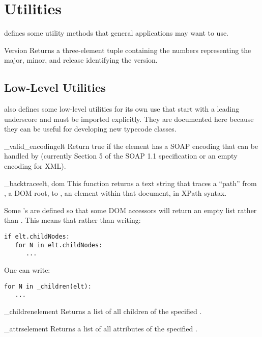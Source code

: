 \chapter{Utilities}

\ZSI{} defines some utility methods that general applications
may want to use.

\begin{funcdesc}{Version}{}
Returns a three-element tuple containing the numbers representing the
major, minor, and release identifying the \ZSI{} version.
\end{funcdesc}

\section{Low-Level Utilities}

\ZSI{} also defines some low-level utilities for its own use that
start with a leading underscore and must be imported explicitly.
They are documented here because they can be useful for developing
new typecode classes.

\begin{funcdesc}{_valid_encoding}{elt}
Return true if the element  has a SOAP encoding
that can be handled by \ZSI{}
(currently Section 5 of the SOAP 1.1 specification or an empty encoding
for XML).
\end{funcdesc}

\begin{funcdesc}{_backtrace}{elt, dom}
This function returns a text string that traces a ``path'' from ,
a DOM root, to , an element within that document, in
XPath syntax.
\end{funcdesc}

Some 's are defined so that some DOM accessors
will return an empty list rather than .
This means that rather than writing:
\begin{verbatim}
if elt.childNodes:
   for N in elt.childNodes:
      ...
\end{verbatim}
One can write:
\begin{verbatim}
for N in _children(elt):
   ...
\end{verbatim}

\begin{funcdesc}{_children}{element}
Returns a list of all children of the specified .
\end{funcdesc}

\begin{funcdesc}{_attrs}{element}
Returns a list of all attributes of the specified .
\end{funcdesc}

